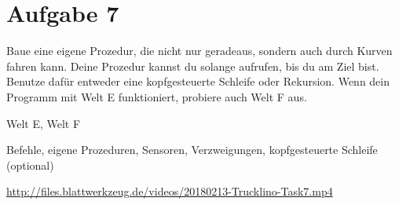\pagebreak

\section*{Aufgabe 7}
\label{sec:exercises:7}

Baue eine eigene Prozedur, die nicht nur geradeaus, sondern auch durch Kurven fahren kann. Deine Prozedur kannst du solange aufrufen, bis du am Ziel bist. Benutze dafür entweder eine kopfgesteuerte Schleife oder Rekursion. Wenn dein Programm mit Welt E funktioniert, probiere auch Welt F aus.

\begin{description}[noitemsep]
  \item[Welt wählen:] Welt E, Welt F
  \item[Du brauchst:] Befehle, eigene Prozeduren, Sensoren, Verzweigungen, kopfgesteuerte Schleife (optional)
  \item[Video:] \url{http://files.blattwerkzeug.de/videos/20180213-Trucklino-Task7.mp4}
\end{description}

